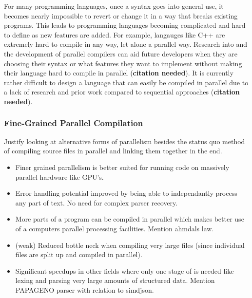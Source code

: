 For many programming languages, once a syntax goes into general use, it becomes
nearly impossible to revert or change it in a way that breaks existing programs.
This leads to programming languages becoming complicated and hard to define as
new features are added. For example, langauges like C++ are extremely hard to
compile in any way, let alone a parallel way. Research into and the development
of parallel compilers can aid future developers when they are choosing their
syntax or what features they want to implement without making their language
hard to compile in parallel (\textbf{citation needed}). It is currently
rather difficult to design a language that can easily be compiled in parallel
due to a lack of research and prior work compared to sequential approaches
(\textbf{citation needed}).

\subsubsection{Fine-Grained Parallel Compilation}
\begin{sectionplan}
	Justify looking at alternative forms of parallelism besides the status quo 	
	method of compiling source files in parallel and linking them together in the
	end.

	\begin{itemize}
     	\item Finer grained parallelism is better suited for running code on 				
			  massively parallel hardware like GPU's.

     	\item Error handling potential improved by being able to independantly
			  process any part of text. No need for complex parser recovery.

     	\item More parts of a program can be compiled in parallel which makes
			  better use of a computers parallel processing facilities. Mention 
			  ahmdals law.

     	\item (weak) Reduced bottle neck when compiling very large files (since 			
			  individual files are split up and compiled in parallel).

		\item Significant speedups in other fields where only one stage of is 
			  needed like lexing and parsing very large amounts of structured 
			  data. Mention PAPAGENO parser with relation to simdjson.
	\end{itemize}
\end{sectionplan}

